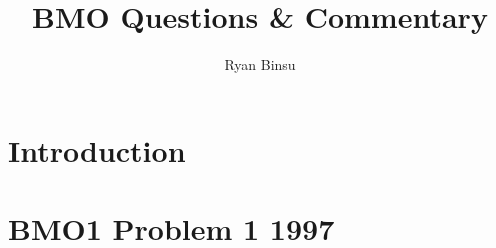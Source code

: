 \documentclass[11pt,a4paper]{article}
\title{BMO Questions \& Commentary}
\author{Ryan Binsu}
\begin{document}
\maketitle

\cleardoublepage

\section{Introduction}

\section{BMO1 Problem 1 1997}
\end{document}
